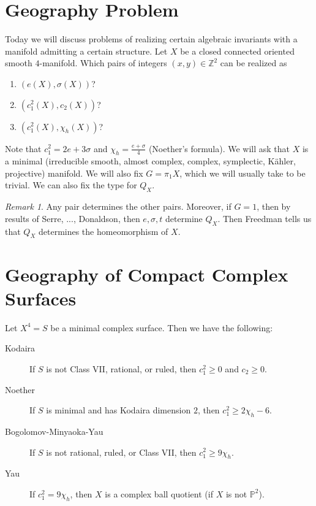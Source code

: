 \documentclass[leqno, openany]{memoir}
\theoremstyle{definition}
\theoremstyle{remark}
\newtheorem{rmk}[thm]{Remark}
\theoremstyle{plain}
\theoremstyle{definition}
\theoremstyle{remark}
\newcommand{\Z}{\mathbb{Z}}
\renewcommand{\P}{\mathbb{P}}
\begin{document}
\section{Geography Problem}%
\label{sec:geography_problem_}

Today we will discuss problems of realizing certain algebraic invariants with a manifold admitting a certain structure. Let $X$ be a closed connected oriented smooth $4$-manifold. Which pairs of integers $(x,y) \in \Z^2$ can be realized as
\begin{enumerate}
    \item $(e(X), \sigma(X))$?
    \item $(c_1^2(X), c_2(X))$?
    \item $(c_1^2(X), \chi_h(X))$?
\end{enumerate}
Note that $c_1^2 = 2e + 3 \sigma$ and $\chi_h = \frac{e+\sigma}{4}$ (Noether's formula).
We will ask that $X$ is a minimal (irreducible smooth, almost complex, complex, symplectic, K\"ahler, projective) manifold. We will also fix $G = \pi_1 X$, which we will usually take to be trivial. We can also fix the type for $Q_X$.

\begin{rmk}
    Any pair determines the other pairs. Moreover, if $G = 1$, then by results of Serre, ..., Donaldson, then $e, \sigma, t$ determine $Q_X$. Then Freedman tells us that $Q_X$ determines the homeomorphism of $X$.
\end{rmk}

\section{Geography of Compact Complex Surfaces}%
\label{sec:geography_of_compact_complex_surfaces}

Let $X^4 = S$ be a minimal complex surface. Then we have the following:
\begin{description}
    \item[Kodaira] If $S$ is not Class VII,  rational, or ruled, then $c_1^2 \geq 0$ and $c_2 \geq 0$.
    \item[Noether] If $S$ is minimal and has Kodaira dimension $2$, then $c_1^2 \geq 2\chi_h - 6$.
    \item[Bogolomov-Minyaoka-Yau] If $S$ is not rational, ruled, or Class VII, then $c_1^2 \geq 9 \chi_h$.
    \item[Yau] If $c_1^2 = 9 \chi_h$, then $X$ is a complex ball quotient (if $X$ is not $\P^2$).
\end{description}
\end{document}
